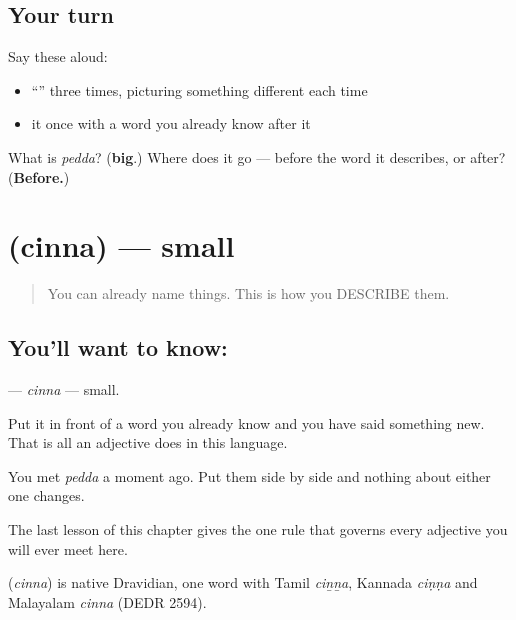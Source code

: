 \subsection*{Your turn}
Say these aloud:

\begin{itemize}
\raggedright
  \item \textquotedblleft{}\textquotedblright{} three times, picturing something different each time
  \item it once with a word you already know after it
\end{itemize}

\begin{tcolorbox}[breakable,colback=teal!4,colframe=teal!35!black,title={Before you move on}]
What is \emph{pedda}? (\textbf{big}.) Where does it go — before the word it describes, or after? (\textbf{Before.})
\end{tcolorbox}
\section[\texorpdfstring{\te{చిన్న} (cinna)}{చిన్న (cinna)}]{ (cinna) — small}

\label{lesson:TE-C42-small}



\begin{quote}
You can already name things. This is how you DESCRIBE them.
\end{quote}

\subsection*{You'll want to know: }
\textbf{} — \emph{cinna} — small.

Put it in front of a word you already know and you have said something new. That is all an adjective does in this language.

You met \textbf{} \emph{pedda} a moment ago. Put them side by side and nothing about either one changes.

The last lesson of this chapter gives the one rule that governs every adjective you will ever meet here.

\begin{cousinweb}
\textbf{} (\emph{cinna}) is native Dravidian, one word with Tamil \emph{ciṉṉa}, Kannada \emph{ciṇṇa} and Malayalam \emph{cinna} (DEDR 2594).
\end{cousinweb}

